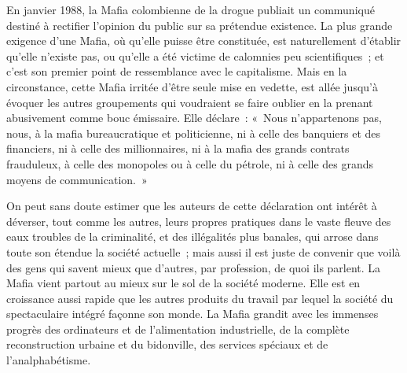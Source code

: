 \documentclass[french,twoside]{book} %
\def\mednobreak{\ifdim\lastskip<\medskipamount
  \removelastskip\nopagebreak\medskip\fi}
\newcommand{\labelblock}[1]{\medbreak{\noindent\color{rubric}\bfseries #1}\par\mednobreak}
\begin{document}
\noindent En janvier 1988, la Mafia colombienne de la drogue publiait un communiqué destiné à rectifier l’opinion du public sur sa prétendue existence. La plus grande exigence d’une Mafia, où qu’elle puisse être constituée, est naturellement d’établir qu’elle n’existe pas, ou qu’elle a été victime de calomnies peu scientifiques ; et c’est son premier point de ressemblance avec le capitalisme. Mais en la circonstance, cette Mafia irritée d’être seule mise en vedette, est allée jusqu’à évoquer les autres groupements qui voudraient se faire oublier en la prenant abusivement comme bouc émissaire. Elle déclare : « Nous n’appartenons pas, nous, à la mafia bureaucratique et politicienne, ni à celle des banquiers et des financiers, ni à celle des millionnaires, ni à la mafia des grands contrats frauduleux, à celle des monopoles ou à celle du pétrole, ni à celle des grands moyens de communication. »\par
On peut sans doute estimer que les auteurs de cette déclaration ont intérêt à déverser, tout comme les autres, leurs propres pratiques dans le vaste fleuve des eaux troubles de la criminalité, et des illégalités plus banales, qui arrose dans toute son étendue la société actuelle ; mais aussi il est juste de convenir que voilà des gens qui savent mieux que d’autres, par profession, de quoi ils parlent. La Mafia vient partout au mieux sur le sol de la société moderne. Elle est en croissance aussi rapide que les autres produits du travail par lequel la société du spectaculaire intégré façonne son monde. La Mafia grandit avec les immenses progrès des ordinateurs et de l’alimentation industrielle, de la complète reconstruction urbaine et du bidonville, des services spéciaux et de l’analphabétisme.\par

\labelblock{XXIV}
\end{document}
